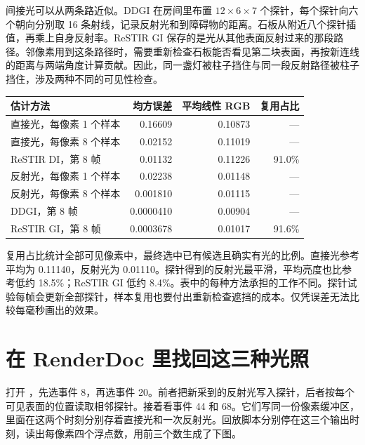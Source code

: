 间接光可以从两条路近似。DDGI 在房间里布置 $12\times6\times7$ 个探针，每个探针向六个朝向分别取 16 条射线，记录反射光和到障碍物的距离。石板从附近八个探针插值，再乘上自身反射率。ReSTIR GI 保存的是光从其他表面反射过来的那段路径。邻像素用到这条路径时，需要重新检查石板能否看见第二块表面，再按新连线的距离与两端角度计算贡献。因此，同一盏灯被柱子挡住与同一段反射路径被柱子挡住，涉及两种不同的可见性检查。

{\noindent\smalltable\begin{tabularx}{\linewidth}{@{}Xrrr@{}}\toprule
估计方法 & 均方误差 & 平均线性 RGB & 复用占比\\\midrule
直接光，每像素 1 个样本 & 0.16609 & 0.10873 & ---\\
直接光，每像素 8 个样本 & 0.02152 & 0.11019 & ---\\
ReSTIR DI，第 8 帧 & 0.01132 & 0.11226 & 91.0\%\\\midrule
反射光，每像素 1 个样本 & 0.02238 & 0.01148 & ---\\
反射光，每像素 8 个样本 & 0.001810 & 0.01115 & ---\\
DDGI，第 8 帧 & 0.0000410 & 0.00904 & ---\\
ReSTIR GI，第 8 帧 & 0.0003678 & 0.01017 & 91.6\%\\\bottomrule
\end{tabularx}\par}

复用占比统计全部可见像素中，最终选中已有候选且确实有光的比例。直接光参考平均为 0.11140，反射光为 0.01110。探针得到的反射光最平滑，平均亮度也比参考低约 18.5\%；ReSTIR GI 低约 8.4\%。表中的每种方法承担的工作不同。探针试验每帧会更新全部探针，样本复用也要付出重新检查遮挡的成本。仅凭误差无法比较每毫秒画出的效果。


\clearpage
\section{在 RenderDoc 里找回这三种光照}
打开 ，先选事件 8，再选事件 20。前者把新采到的反射光写入探针，后者按每个可见表面的位置读取相邻探针。接着看事件 44 和 68。它们写同一份像素缓冲区，里面在这两个时刻分别存着直接光和一次反射光。回放脚本分别停在这三个输出时刻，读出每像素四个浮点数，用前三个数生成了下图。

